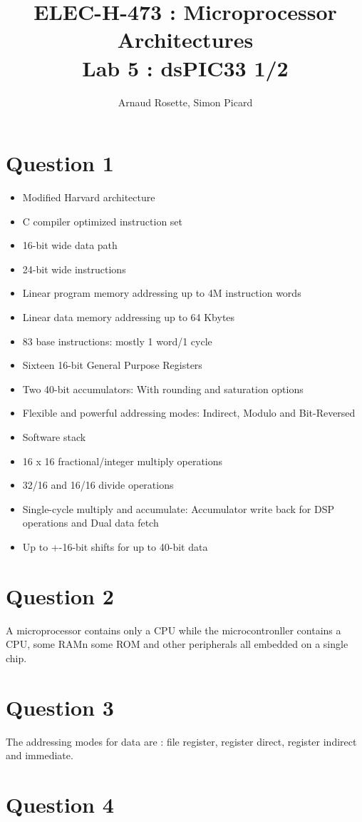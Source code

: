 \documentclass[a4paper,10pt]{article}
\title{ELEC-H-473 : Microprocessor Architectures\\ Lab 5 : dsPIC33 1/2}
\author{Arnaud Rosette, Simon Picard}
\begin{document}
\maketitle
\section*{Question 1}
\begin{itemize}
\item Modified Harvard architecture
\item C compiler optimized instruction set
\item 16-bit wide data path
\item 24-bit wide instructions
\item Linear program memory addressing up to 4M
instruction words
\item Linear data memory addressing up to 64 Kbytes
\item 83 base instructions: mostly 1 word/1 cycle
\item Sixteen 16-bit General Purpose Registers
\item Two 40-bit accumulators: With rounding and saturation options
\item Flexible and powerful addressing modes: Indirect, Modulo and Bit-Reversed
\item Software stack
\item 16 x 16 fractional/integer multiply operations
\item 32/16 and 16/16 divide operations
\item Single-cycle multiply and accumulate: Accumulator write back for DSP operations and Dual data fetch
\item Up to +-16-bit shifts for up to 40-bit data
\end{itemize}

\section*{Question 2}
A microprocessor contains only a CPU while the microcontronller contains a CPU, some RAMn some ROM and other peripherals all embedded on a single chip.
\section*{Question 3}
The addressing modes for data are : file register, register direct, register indirect and immediate.

\section*{Question 4}
\end{document}
